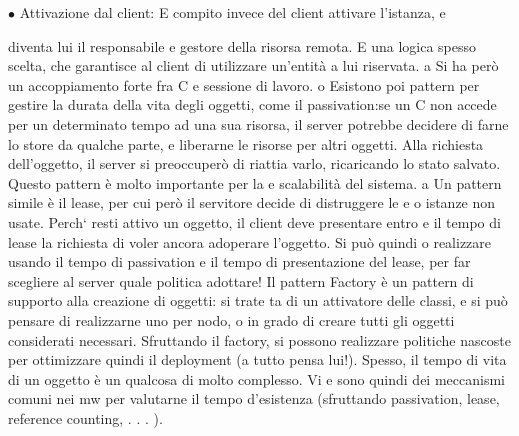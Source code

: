 $\bullet$ Attivazione dal client: E compito invece del client attivare l'istanza, e

diventa lui il responsabile e gestore della risorsa remota. E una logica
spesso scelta, che garantisce al client di utilizzare un'entità a lui riservata.
a
Si ha però un accoppiamento forte fra C e sessione di lavoro.
o
Esistono poi pattern per gestire la durata della vita degli oggetti, come il passivation:se un C non accede per un
determinato tempo ad una sua risorsa, il
server potrebbe decidere di farne lo store da qualche parte, e liberarne le risorse
per altri oggetti. Alla richiesta dell'oggetto, il server si preoccuperò di riattia
varlo, ricaricando lo stato salvato. Questo pattern è molto importante per la
e
scalabilità del sistema.
a
Un pattern simile è il lease, per cui però il servitore decide di distruggere le
e
o
istanze non usate. Perch` resti attivo un oggetto, il client deve presentare entro
e
il tempo di lease la richiesta di voler ancora adoperare l'oggetto. Si può quindi
o
realizzare usando il tempo di passivation e il tempo di presentazione del lease,
per far scegliere al server quale politica adottare!
Il pattern Factory è un pattern di supporto alla creazione di oggetti: si trate
ta di un attivatore delle classi, e si può pensare di realizzarne uno per nodo,
o
in grado di creare tutti gli oggetti considerati necessari. Sfruttando il factory,
si possono realizzare politiche nascoste per ottimizzare quindi il deployment (a
tutto pensa lui!).
Spesso, il tempo di vita di un oggetto è un qualcosa di molto complesso. Vi
e
sono quindi dei meccanismi comuni nei mw per valutarne il tempo d'esistenza
(sfruttando passivation, lease, reference counting, . . . ).

